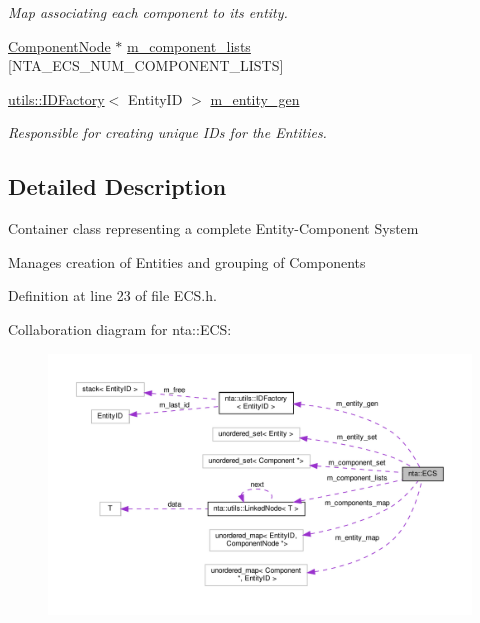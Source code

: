 \begin{DoxyCompactItemize}
\begin{DoxyCompactList}\small\item\em Map associating each component to its entity. \end{DoxyCompactList}\item 
\hyperlink{structnta_1_1utils_1_1LinkedNode}{Component\+Node} $\ast$ \hyperlink{classnta_1_1ECS_a2d45b9e54bcc636faac7cbb403b478bd}{m\+\_\+component\+\_\+lists} \mbox{[}N\+T\+A\+\_\+\+E\+C\+S\+\_\+\+N\+U\+M\+\_\+\+C\+O\+M\+P\+O\+N\+E\+N\+T\+\_\+\+L\+I\+S\+TS\mbox{]}
\item 
\mbox{\label{classnta_1_1ECS_a8c2683281c1f6bfdc2765cca5059c8af}} 
\hyperlink{classnta_1_1utils_1_1IDFactory}{utils\+::\+I\+D\+Factory}$<$ Entity\+ID $>$ \hyperlink{classnta_1_1ECS_a8c2683281c1f6bfdc2765cca5059c8af}{m\+\_\+entity\+\_\+gen}
\begin{DoxyCompactList}\small\item\em Responsible for creating unique I\+Ds for the Entities. \end{DoxyCompactList}\end{DoxyCompactItemize}


\subsection{Detailed Description}
Container class representing a complete Entity-\/\+Component System

Manages creation of Entities and grouping of Components 

Definition at line 23 of file E\+C\+S.\+h.



Collaboration diagram for nta\+:\+:E\+CS\+:\nopagebreak
\begin{figure}[H]
\begin{center}
\leavevmode
\includegraphics[width=350pt]{d5/d5c/classnta_1_1ECS__coll__graph}
\end{center}
\end{figure}


